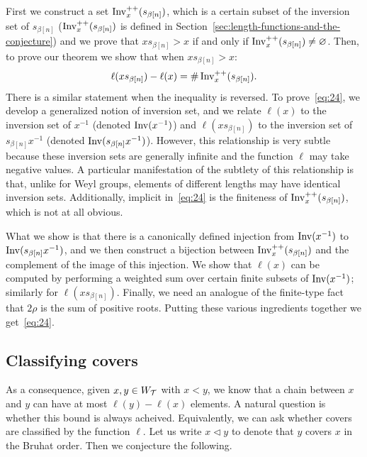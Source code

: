 \documentclass[10pt]{amsart}
\begin{document}
First we construct a set $\operatorname{Inv}^{++}_x(s_{\beta[n]})$, which is a certain subset of the inversion set of $s_{\beta[n]}$ ($\operatorname{Inv}^{++}_x(s_{\beta[n]})$ is defined in Section~\ref{sec:length-functions-and-the-conjecture}) and we prove that $ x s_{\beta[n]} > x$ if and only if $\operatorname{Inv}^{++}_x(s_{\beta[n]}) \neq \varnothing$. Then, to prove our theorem we show that when $x s_{\beta[n]} > x$:
\begin{equation}\label{eq:24}
\ell(x s_{\beta[n]}) - \ell(x) = \# \Inv^{++}_x(s_{\beta[n]}).
\end{equation}
There is a similar statement when the inequality is reversed. To prove~\eqref{eq:24}, we develop a generalized notion of inversion set, and we relate $\ell(x)$ to the inversion set of $x^{-1}$ (denoted $\operatorname{Inv}(x^{-1})$) and $\ell(x s_{\beta[n]})$ to the inversion set of $s_{\beta[n]}x^{-1}$ (denoted $\operatorname{Inv}(s_{\beta[n]}x^{-1})$). However, this relationship is very subtle because these inversion sets are generally infinite and the function $\ell$ may take negative values. A particular manifestation of the subtlety of this relationship is that, unlike for Weyl groups, elements of different lengths may have identical inversion sets. Additionally, implicit in~\eqref{eq:24} is the finiteness of $\operatorname{Inv}^{++}_x(s_{\beta[n]})$, which is not at all obvious.

What we show is that there is a canonically defined injection from $\operatorname{Inv}(x^{-1})$ to $\operatorname{Inv}(s_{\beta[n]}x^{-1})$, and we then construct a bijection between $\operatorname{Inv}^{++}_x(s_{\beta[n]})$ and the complement of the image of this injection. We show that $\ell(x)$ can be computed by performing a weighted sum over certain finite subsets of $\operatorname{Inv}(x^{-1})$; similarly for $\ell(xs_{\beta[n]})$. Finally, we need an analogue of the finite-type fact that $2\rho$ is the sum of positive roots. Putting these various ingredients together we get~\eqref{eq:24}.

\subsection{Classifying covers}

As a consequence, given $x,y \in W_{\mathcal{T}}$ with $x < y$, we know that a chain between $x$ and $y$ can have at most $\ell(y) - \ell(x)$ elements. A natural question is whether this bound is always acheived. Equivalently, we can ask whether covers are classified by the function $\ell$. Let us write $x \lhd y$ to denote that $y$ covers $x$ in the Bruhat order. Then we conjecture the following.
\end{document}
